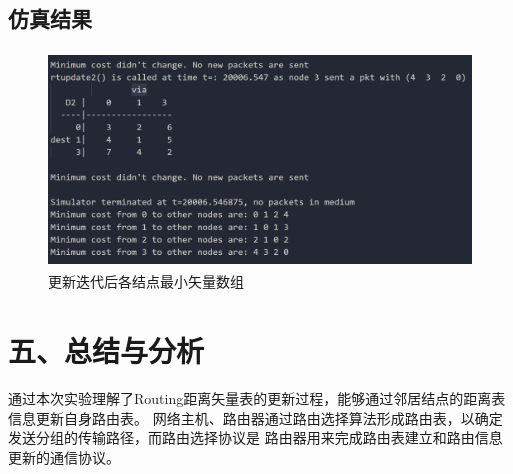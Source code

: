 \documentclass[UTF8,14pt]{article}
\numberwithin{figure}{section}
\begin{document}
\subsection{仿真结果}
\begin{figure}[ht]
    \centering
    \includegraphics[width=11.59cm,height=5.73cm]{1.bmp}
    \caption{更新迭代后各结点最小矢量数组}
\end{figure}

\newpage
\section{五、总结与分析}
通过本次实验理解了Routing距离矢量表的更新过程，能够通过邻居结点的距离表信息更新自身路由表。
网络主机、路由器通过路由选择算法形成路由表，以确定发送分组的传输路径，而路由选择协议是
路由器用来完成路由表建立和路由信息更新的通信协议。
\end{document}
